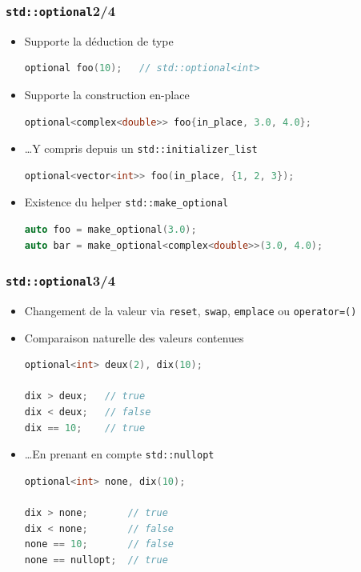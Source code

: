 \documentclass[C++.tex]{subfiles}
\begin{document}
\begin{frame}[fragile]
	\frametitle{\lstinline|std::optional|\titlehfill{}2/4}
	\begin{itemize}
		\item Supporte la déduction de type

	\begin{lstlisting}[language=C++]
optional foo(10);	// std::optional<int>\end{lstlisting}

		\item Supporte la construction \og en-place\fg{}
		
	\begin{lstlisting}[language=C++]
optional<complex<double>> foo{in_place, 3.0, 4.0};\end{lstlisting}
		
		\item \ldots Y compris depuis un \lstinline|std::initializer_list|
	\begin{lstlisting}[language=C++]
optional<vector<int>> foo(in_place, {1, 2, 3});\end{lstlisting}

		\item Existence du helper \lstinline|std::make_optional|
		
	\begin{lstlisting}[language=C++]
auto foo = make_optional(3.0);
auto bar = make_optional<complex<double>>(3.0, 4.0);\end{lstlisting}
	\end{itemize}
\end{frame}

\begin{frame}[fragile]
	\frametitle{\lstinline|std::optional|\titlehfill{}3/4}
	\begin{itemize}
		\item Changement de la valeur via \lstinline|reset|, \lstinline|swap|, \lstinline|emplace| ou \lstinline|operator=()|
		\item Comparaison naturelle des valeurs contenues 

		\begin{lstlisting}[language=C++]
optional<int> deux(2), dix(10);

dix > deux;   // true	
dix < deux;   // false
dix == 10;    // true\end{lstlisting}

		\item \ldots En prenant en compte \lstinline|std::nullopt|

		\begin{lstlisting}[language=C++]
optional<int> none, dix(10);

dix > none;       // true	
dix < none;       // false
none == 10;       // false
none == nullopt;  // true\end{lstlisting}
	\end{itemize}
\end{frame}
\end{document}
